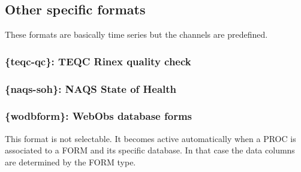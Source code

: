 \subsection{Other specific formats}

These formats are basically time series but the channels are predefined.

\subsubsection{\{teqc-qc\}: TEQC Rinex quality check}

\subsubsection{\{naqs-soh\}: NAQS State of Health}

\subsubsection{\{wodbform\}: WebObs database forms}

This format is not selectable. It becomes active automatically when a PROC is associated to a FORM and its specific database. In that case the data columns are determined by the FORM type.
